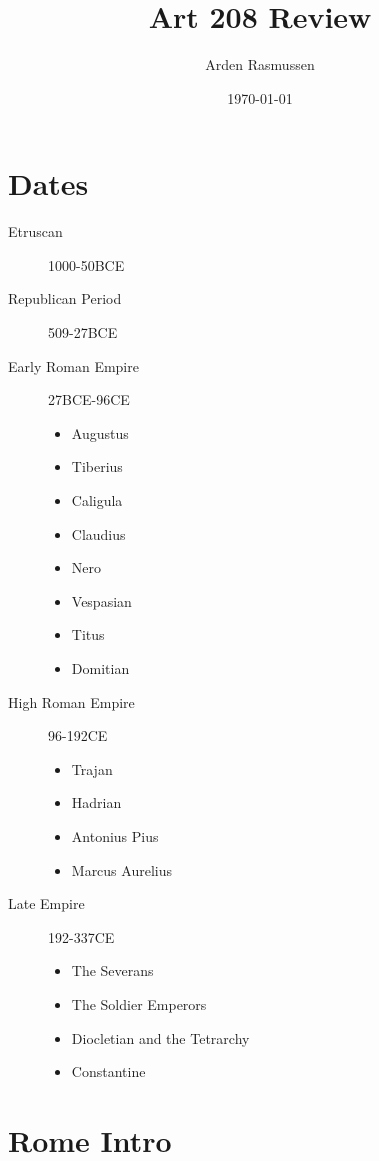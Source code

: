 \documentclass[10pt]{armath}
\title{Art 208 Review}
\author{Arden Rasmussen}
\date{\today}
\begin{document}
\maketitle

\begin{multicols}{2}
\section{Dates}%
\label{sec:dates}

\begin{description}
  \item[Etruscan] 1000-50BCE
  \item[Republican Period] 509-27BCE
  \item[Early Roman Empire] 27BCE-96CE
    \begin{itemize}
      \item Augustus
      \item Tiberius
      \item Caligula
      \item Claudius
      \item Nero
      \item Vespasian
      \item Titus
      \item Domitian
    \end{itemize}
  \item[High Roman Empire] 96-192CE
    \begin{itemize}
      \item Trajan
      \item Hadrian
      \item Antonius Pius
      \item Marcus Aurelius
    \end{itemize}
  \item[Late Empire] 192-337CE
    \begin{itemize}
      \item The Severans
      \item The Soldier Emperors
      \item Diocletian and the Tetrarchy
      \item Constantine
    \end{itemize}
\end{description}

\section{Rome Intro}%
\label{sec:rome_intro}


\end{multicols}
\end{document}
